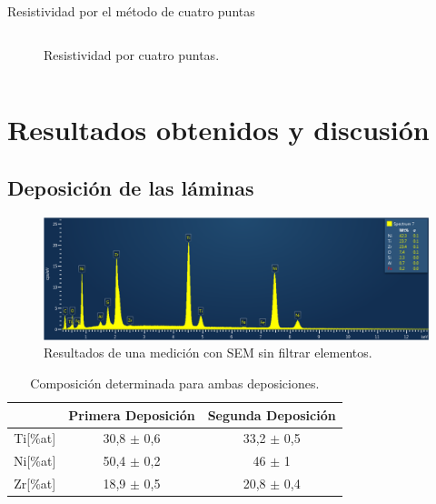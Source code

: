 \documentclass[11pt]{beamer}
\begin{document}
\begin{frame}{Resistividad por el método de cuatro puntas}
\begin{columns}
\begin{column}{.49\textwidth}
\begin{figure}[H]
						\caption*{Resistividad por cuatro puntas.}
					\end{figure}
				\end{column}
			\end{columns}
		\end{frame}
	
\section{Resultados obtenidos y discusión}
	\subsection{Deposición de las láminas}
		\begin{frame}
			\begin{figure}
				\includegraphics[scale=0.25]{img/SEMAllElements.png}
				\caption*{Resultados de una medición con SEM sin filtrar elementos.}
			\end{figure}
			\begin{table}[H]
				\centering
				\begin{tabular}{c|c|c|}
				\cline{2-3}
				\multicolumn{1}{l|}{} & Primera Deposición & Segunda Deposición \\ \hline
				\multicolumn{1}{|c|}{Ti{[}\%at{]}} & 30,8 $\pm$ 0,6 & 33,2 $\pm$ 0,5 \\ \hline
				\multicolumn{1}{|c|}{Ni{[}\%at{]}} & 50,4 $\pm$ 0,2 & 46 $\pm$ 1 \\ \hline
				\multicolumn{1}{|c|}{Zr{[}\%at{]}} & 18,9 $\pm$ 0,5 & 20,8 $\pm$ 0,4 \\ \hline
				\end{tabular}
				\caption*{Composición determinada para ambas deposiciones.}
				\label{compositionAvg}
			\end{table}
		\end{frame}
\end{document}
